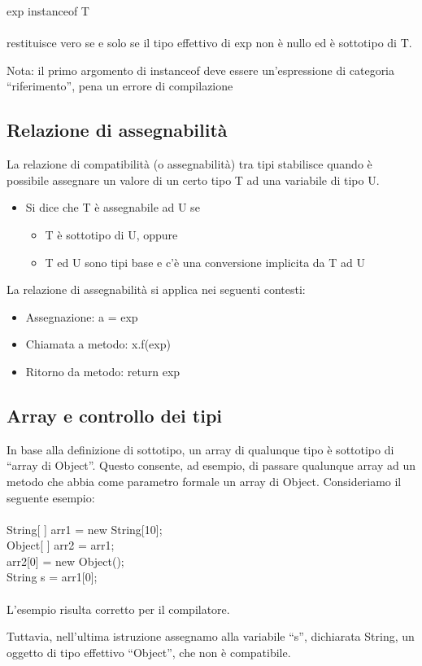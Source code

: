 \documentclass[10pt]{article}
\begin{document}
exp instanceof T\\\\
restituisce vero se e solo se il tipo effettivo di exp non è nullo ed è sottotipo di T.

Nota: il primo argomento di instanceof deve essere un’espressione di categoria “riferimento”, 
pena un errore di compilazione
\subsection{Relazione di assegnabilità}
La relazione di compatibilità (o assegnabilità) tra tipi stabilisce quando è possibile 
assegnare un valore di un certo tipo T ad una variabile di tipo U.
\begin{itemize}
    \item  Si dice che T è assegnabile ad U se
    \begin{itemize}
        \item T è sottotipo di U, oppure
        \item T ed U sono tipi base e c'è una conversione implicita da T ad U
    \end{itemize}
\end{itemize}
La relazione di assegnabilità si applica nei seguenti contesti:
\begin{itemize}
    \item Assegnazione: a = exp
    \item Chiamata a metodo: x.f(exp)
    \item Ritorno da metodo: return exp
\end{itemize}
\subsection{Array e controllo dei tipi}
In base alla definizione di sottotipo, un array di qualunque tipo è sottotipo di “array di 
Object”.
Questo consente, ad esempio, di passare qualunque array ad un metodo che abbia come 
parametro formale un array di Object.
 Consideriamo il seguente esempio:\\\\
String[ ] arr1 = new String[10];\\
Object[ ] arr2 = arr1; \\
arr2[0] = new Object();\\
String s = arr1[0];\\\\
L'esempio risulta corretto per il compilatore.

Tuttavia, nell'ultima istruzione assegnamo alla variabile “s”, dichiarata String, un oggetto di 
tipo effettivo “Object”, che non è compatibile.
\end{document}
